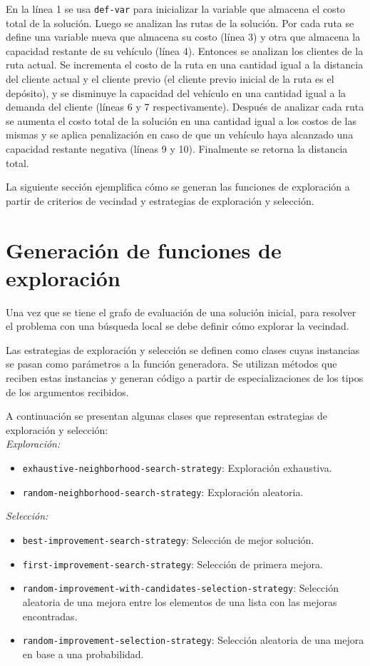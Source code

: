 En la línea 1 se usa \texttt{def-var} para inicializar la variable que almacena el costo total de la solución. Luego se analizan las rutas de la solución. Por cada ruta se define una variable nueva que almacena su costo (línea 3) y otra que almacena la capacidad restante de su vehículo (línea 4). Entonces se analizan los clientes de la ruta actual. Se incrementa el costo de la ruta en una cantidad igual a la distancia del cliente actual y el cliente previo (el cliente previo inicial de la ruta es el depósito), y se disminuye la capacidad del vehículo en una cantidad igual a la demanda del cliente (líneas 6 y 7 respectivamente). Después de analizar cada ruta se aumenta el costo total de la solución en una cantidad igual a los costos de las mismas y se aplica penalización en caso de que un vehículo haya alcanzado una capacidad restante negativa (líneas 9 y 10). Finalmente se retorna la distancia total.

La siguiente sección ejemplifica cómo se generan las funciones de exploración a partir de criterios de vecindad y estrategias de exploración y selección.

\section{Generación de funciones de exploración}\label{4-generator}

Una vez que se tiene el grafo de evaluación de una solución inicial, para resolver el problema con una búsqueda local se debe definir cómo explorar la vecindad.

Las estrategias de exploración y selección se definen como clases cuyas instancias se pasan como parámetros a la función generadora. Se utilizan métodos que reciben estas instancias y generan código a partir de especializaciones de los tipos de los argumentos recibidos.

A continuación se presentan algunas clases que representan estrategias de exploración y selección:\\

\textit{Exploración:}
\begin{itemize}
	\item \texttt{exhaustive-neighborhood-search-strategy}: Exploración exhaustiva.
	\item \texttt{random-neighborhood-search-strategy}: Exploración aleatoria.
\end{itemize}

\textit{Selección:}
\begin{itemize}
	\item \texttt{best-improvement-search-strategy}: Selección de mejor solución.
	\item \texttt{first-improvement-search-strategy}: Selección de primera mejora.
	\item \texttt{random-improvement-with-candidates-selection-strategy}: Selección aleatoria de una mejora entre los elementos de una lista con las mejoras encontradas.
	\item \texttt{random-improvement-selection-strategy}: Selección aleatoria de una mejora en base a una probabilidad.
\end{itemize}

